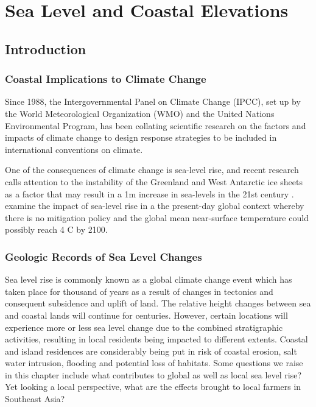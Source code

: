 \chapter{Sea Level and Coastal Elevations}\label{ch:subsidence}

\section{Introduction}

\subsection{Coastal Implications to Climate Change}

Since 1988, the Intergovernmental Panel on Climate Change (IPCC), set up by the World Meteorological Organization (WMO) and the United Nations Environmental Program, has been collating scientific research on the factors and impacts of climate change to design response strategies to be included in international conventions on climate. 

One of the consequences of climate change is sea-level rise, and recent research calls attention to the instability of the Greenland and West Antarctic ice sheets as a factor that may result in a 1m increase in sea-levels in the 21st century \citep{nicholls2010sea}. \citet{nicholls2010sea} examine the impact of sea-level rise in a the present-day global context whereby there is no mitigation policy and the global mean near-surface temperature could possibly reach 4 \degree C by 2100.

\subsection{Geologic Records of Sea Level Changes}
  
Sea level rise is commonly known as a global climate change event which has taken place for thousand of years as a result of changes in tectonics and consequent subsidence and uplift of  land. The relative height changes between sea and coastal lands will continue for centuries. However, certain locations will experience more or less sea level change due to the combined stratigraphic activities, resulting in local residents being impacted to different extents. Coastal and island residences are considerably being put in risk of coastal erosion, salt water intrusion, flooding and potential loss of habitats. Some questions we raise in this chapter include what contributes to global as well as local sea level rise?  Yet looking a local perspective, what are the effects brought to local farmers in Southeast Asia?

